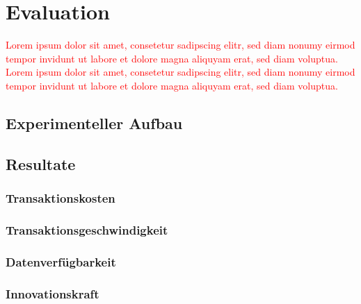 \section{Evaluation}
\textcolor{red}{Lorem ipsum dolor sit amet, consetetur sadipscing elitr, sed diam nonumy eirmod tempor invidunt ut labore et dolore magna aliquyam erat, sed diam voluptua. Lorem ipsum dolor sit amet, consetetur sadipscing elitr, sed diam nonumy eirmod tempor invidunt ut labore et dolore magna aliquyam erat, sed diam voluptua.}

\subsection{Experimenteller Aufbau}

\subsection{Resultate}

\subsubsection{Transaktionskosten}

\subsubsection{Transaktionsgeschwindigkeit}

\subsubsection{Datenverfügbarkeit}

\subsubsection{Innovationskraft}


\newpage
